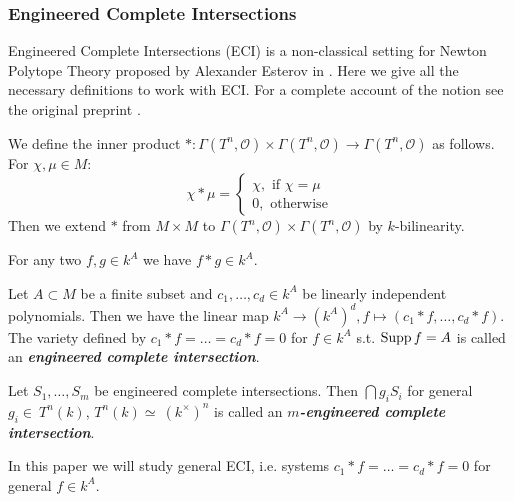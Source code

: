 \subsubsection{Engineered Complete Intersections}\label{sssec:prelim_engineered}
Engineered Complete Intersections (ECI) is a non-classical setting for Newton Polytope Theory proposed by Alexander Esterov in \cite{Esterov2024}. Here we give all the necessary definitions to work with ECI. For a complete account of the notion see the original preprint \cite{Esterov2024}.
\begin{definition}
    We define the inner product $\ast : \Gamma(T^n, \mathcal O) \times \Gamma(T^n, \mathcal O) \to \Gamma(T^n, \mathcal O)$ as follows. For $\chi, \mu \in M$:
    \[
    \chi * \mu = 
    \begin{cases}
        \chi, \text{ if } \chi = \mu \\
        0, \text{ otherwise}
    \end{cases}
    \]
    Then we extend $*$ from $M \times M$ to $\Gamma(T^n, \mathcal O) \times \Gamma(T^n, \mathcal O)$ by $k$-bilinearity.
\end{definition}
\begin{remark}
    For any two $f, g \in k^A$ we have $f * g \in k^A$.
\end{remark}
\begin{definition}
    Let $A \subset M$ be a finite subset and $c_1, \dots, c_d \in k^A$ be linearly independent polynomials. Then we have the linear map $k^A \to (k^A)^d, f \mapsto (c_1 * f, \dots, c_d * f)$. The variety defined by $c_1 * f = \dots = c_d * f = 0$ for $f \in k^A$ s.t. $\operatorname{Supp} f = A$ is called an \textbf{\textit{engineered complete intersection}}.
    
    Let $S_1, \dots, S_m$ be engineered complete intersections. Then $\bigcap g_i S_i$ for general $g_i \in ~T^n(k)$, $T^n(k) \simeq ~(k^\times)^n$ is called an \textit{\textbf{$m$-engineered complete intersection}}.
\end{definition}

\begin{remark}
    In this paper we will study general ECI, i.e. systems $c_1 * f = \dots = c_d * f = 0$ for general $f \in k^A$.
\end{remark}


